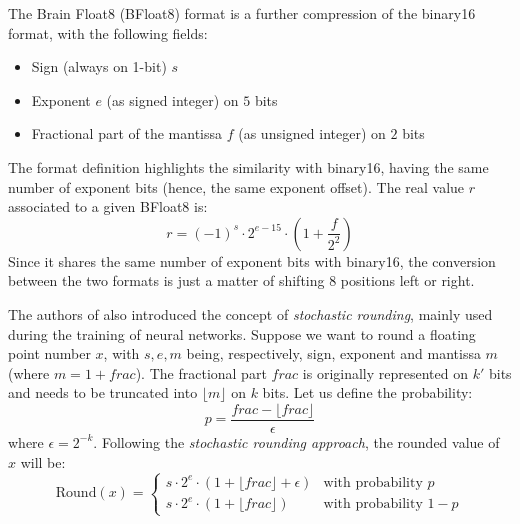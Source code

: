 The Brain Float8 (BFloat8) format \cite{naveen2019mixed} is a further compression of the binary16 format, with the following fields:
\begin{itemize}
    \item Sign (always on 1-bit) $s$
    \item Exponent $e$ (as signed integer) on $5$ bits
    \item Fractional part of the mantissa $f$ (as unsigned integer) on $2$ bits
\end{itemize}
The format definition highlights the similarity with binary16, having the same number of exponent bits (hence, the same exponent offset). The real value $r$ associated to a given BFloat8 is:
\begin{equation}\label{eqn:bfloat82real}
    r = (-1)^s \cdot 2^{e-15} \cdot \left(1 + \frac{f}{2^2} \right)
\end{equation}
Since it shares the same number of exponent bits with binary16, the conversion between the two formats is just a matter of shifting 8 positions left or right.

The authors of \cite{naveen2019mixed} also introduced the concept of \textit{stochastic rounding}, mainly used during the training of neural networks.
Suppose we want to round a floating point number $x$, with $s,e,m$ being, respectively, sign, exponent and mantissa $m$ (where $m = 1 + frac$). The fractional part $frac$ is originally represented on $k'$ bits and needs to be truncated into $\lfloor m \rfloor$ on $k$ bits. Let us define the probability: 
\begin{equation}\label{eqn:bfloat8StochProb}
    p = \frac{frac- \lfloor frac \rfloor}{\epsilon}
\end{equation}
where $\epsilon = 2^{-k}$.
Following the \textit{stochastic rounding approach}, the rounded value of $x$ will be:
\begin{equation}\label{eqn:bfloat8Rounded}
\text{Round}(x) = 
\left\{\begin{matrix}
s \cdot 2^e \cdot ( 1 + \lfloor frac \rfloor + \epsilon) & \text{with probability } p \\ 
s \cdot 2^e \cdot ( 1 + \lfloor frac \rfloor) & \text{with probability } 1-p 
\end{matrix}\right.
\end{equation}

